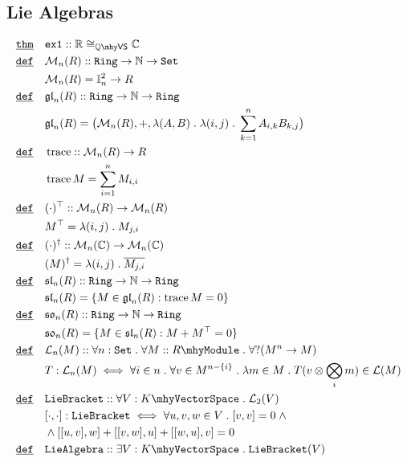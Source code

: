 \documentclass[12pt]{article}
\DeclareMathOperator*{\trace}{\mathrm{trace}}
\renewcommand{\.}{\; . \;}
\newcommand{\reals}{\mathbb{R}}
\newcommand{\nat}{\mathbb{N}}
\newcommand{\De}{\underline{\mathtt{def}} \quad}
\newcommand{\Thm}{\underline{\mathtt{thm}} \quad}
\newcommand{\module}[1]{{#1} \mhy \mathtt{Module}}
\newcommand{\linear}[1]{\mathcal{L}(#1)}
\newcommand{\ring}{\mathtt{Ring}}
\newcommand{\VS}[1]{#1 \mhy \mathsf{VS} }
\newcommand{\vs}[1]{#1 \mhy \mathtt{VectorSpace}}
\newcommand{\set}{\mathtt{Set}}
\begin{document}
\subsection{Lie Algebras}
\begin{align*}
\Thm & \mathtt{ex1} :: \reals \cong_{\VS{\mathbb{Q}}} \mathbb{C} \\
\De  &\mathcal{M}_n(R) :: \ring \to \nat \to \set \\
	 &\mathcal{M}_n(R) = \mathbb{I}_n^2 \to R \\
\De &\mathfrak{gl}_n(R) :: \ring \to \nat \to \ring \\
	 &\mathfrak{gl}_n(R) = \big( \mathcal{M}_n(R) , +, \lambda (A,B) \. \lambda (i,j) \. 
	 \sum^n_{k=1} A_{i,k}B_{k,j} \big) \\
\De & \trace :: \mathcal{M}_n(R) \to R \\
	& \trace  M = \sum^n_{i = 1} M_{i,i} \\
\De & (\cdot)^\top :: \mathcal{M}_n(R) \to \mathcal{M}_n(R) \\
	&  M^\top =  \lambda (i,j) \. M_{j,i} \\
\De &  (\cdot)^\dagger  :: \mathcal{M}_n(\mathbb{C}) \to \mathcal{M}_n(\mathbb{C}) \\
    &  (M)^\dagger =     \lambda (i,j) \. \overline{M_{j,i}} \\                                
\De & \mathfrak{sl}_n(R) :: \ring \to \nat \to \ring \\
	& \mathfrak{sl}_n(R) = \{M \in \mathfrak{gl}_n(R): \trace M = 0 \} \\
\De & \mathfrak{so}_n(R) :: \ring \to \nat \to \ring \\
	& \mathfrak{s0}_n(R) = \{M \in \mathfrak{sl}_n(R):  M + M^{\top} = 0 \} \\
\De & \mathcal{L}_n(M) :: \forall n : \set \. \forall M :: \module{R} \.  \forall ?(M^n \to M) \\
	&  T : \mathcal{L}_n(M) \iff \forall i \in n \. \forall v \in M^{n - \{i\}} \.
		\lambda m \in M \.T( v \otimes \bigotimes_{ i} m) \in \linear{M} \\  
\De & \mathtt{LieBracket} :: \forall V : \vs{K} \. \mathcal{L}_{2}(V) \\
    &  [\cdot,\cdot]: \mathtt{LieBracket} \iff \forall u,v,w \in V \. [v,v] = 0 \; \wedge \\ 
    & \wedge [[u,v],w] + [[v,w],u] + [[w,u],v] = 0 \\
\De &\mathtt{LieAlgebra} :: \exists V : \vs{K} \. \mathtt{LieBracket}(V) 
\end{align*}
\end{document}
